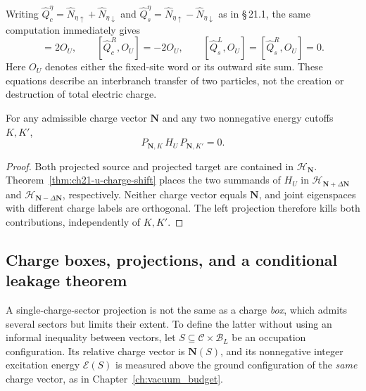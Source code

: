 Writing \(\widehat Q_c^\eta=\widehat N_{\eta\uparrow}
 +\widehat N_{\eta\downarrow}\) and
\(\widehat Q_s^\eta=\widehat N_{\eta\uparrow}
 -\widehat N_{\eta\downarrow}\) as in \S\,21.1, the same computation
immediately gives
\begin{equation}
 [\widehat Q_c^L,O_U]=2O_U,\qquad
 [\widehat Q_c^R,O_U]=-2O_U,\qquad
 [\widehat Q_s^L,O_U]=[\widehat Q_s^R,O_U]=0.
 \label{eq:ch21-u-branch-shifts}
\end{equation}
Here \(O_U\) denotes either the fixed-site word or its outward site sum.
These equations describe an interbranch transfer of two particles,
not the creation or destruction of total electric charge.

\begin{corollary}
\label{cor:ch21-u-sector-compression}
For any admissible charge vector \(\mathbf N\) and any two nonnegative
energy cutoffs \(K,K'\),
\begin{equation}
 P_{\mathbf N,K}\,H_U\,P_{\mathbf N,K'}=0.
 \label{eq:ch21-u-zero-compression}
\end{equation}
\end{corollary}
\begin{proof}
Both projected source and projected target are contained in
\(\mathcal H_{\mathbf N}\).  Theorem~\ref{thm:ch21-u-charge-shift}
places the two summands of \(H_U\) in
\(\mathcal H_{\mathbf N+\Delta\mathbf N}\) and
\(\mathcal H_{\mathbf N-\Delta\mathbf N}\), respectively.  Neither
charge vector equals \(\mathbf N\), and joint eigenspaces with
different charge labels are orthogonal.  The left projection therefore
kills both contributions, independently of \(K,K'\).
\end{proof}

\subsection*{Charge boxes, projections, and a conditional leakage theorem}

A single-charge-sector projection is not the same as a charge
\emph{box}, which admits several sectors but limits their extent.
To define the latter without using an informal inequality between
vectors, let \(S\subseteq\mathcal C\times\mathcal B_L\) be an
occupation configuration.  Its relative charge vector is
\(\mathbf N(S)\), and its nonnegative integer excitation energy
\(\mathcal E(S)\) is measured above the ground configuration of the
\emph{same} charge vector, as in Chapter~\ref{ch:vacuum_budget}.

